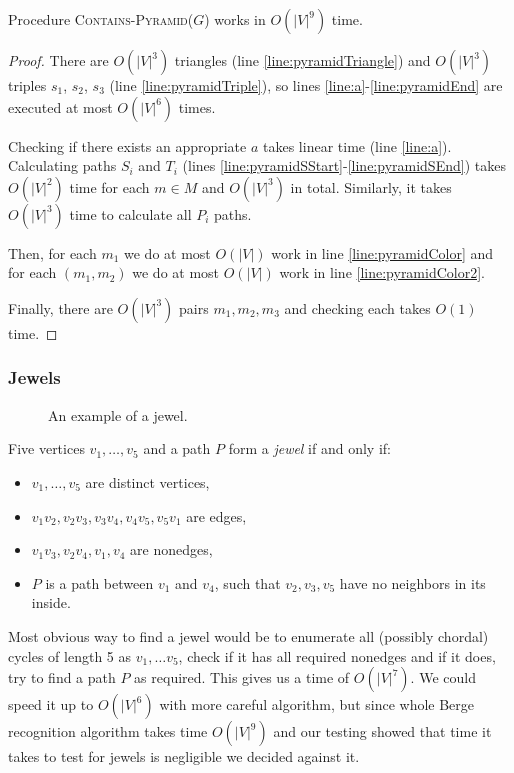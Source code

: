 \begin{theorem}
	Procedure \textsc{Contains-Pyramid($G$)} works in $O(|V|^9)$ time.
\end{theorem}
\begin{proof}
	There are $O(|V|^3)$ triangles (line \ref{line:pyramidTriangle}) and $O(|V|^3)$ triples $s_1$, $s_2$, $s_3$ (line \ref{line:pyramidTriple}), so lines \ref{line:a}-\ref{line:pyramidEnd} are executed at most $O(|V|^6)$ times.

	Checking if there exists an appropriate $a$ takes linear time (line \ref{line:a}). Calculating paths $S_i$ and $T_i$ (lines \ref{line:pyramidSStart}-\ref{line:pyramidSEnd}) takes $O(|V|^2)$ time for each $m \in M$ and $O(|V|^3)$ in total. Similarly, it takes $O(|V|^3)$ time to calculate all $P_i$ paths.

	Then, for each $m_1$ we do at most $O(|V|)$ work in line \ref{line:pyramidColor} and for each $(m_1, m_2)$ we do at most $O(|V|)$ work in line \ref{line:pyramidColor2}.

	Finally, there are $O(|V|^3)$ pairs $m_1, m_2, m_3$ and checking each takes $O(1)$ time.
\end{proof}

\subsubsection{Jewels}

\begin{wrapfigure}{r}{0.35\textwidth}
	
	\caption{An example of a jewel.}
	\vspace{-1.5cm}
\end{wrapfigure}


Five vertices $v_1, \ldots, v_5$ and a path $P$ form a \emph{jewel} if and only if:

\begin{itemize}
	\item $v_1, \ldots, v_5$ are distinct vertices,
	\item $v_1v_2, v_2v_3, v_3v_4, v_4v_5, v_5v_1$ are edges,
	\item $v_1v_3, v_2v_4, v_1,v_4$ are nonedges,
	\item $P$ is a path between $v_1$ and $v_4$, such that $v_2, v_3, v_5$ have no neighbors in its inside.
\end{itemize}

Most obvious way to find a jewel would be to enumerate all (possibly chordal) cycles of length 5 as $v_1, \ldots v_5$, check if it has all required nonedges and if it does, try to find a path $P$ as required. This gives us a time of $O(|V|^7)$. We could speed it up to $O(|V|^6)$ with more careful algorithm, but since whole Berge recognition algorithm takes time $O(|V|^9)$ and our testing showed that time it takes to test for jewels is negligible we decided against it.

